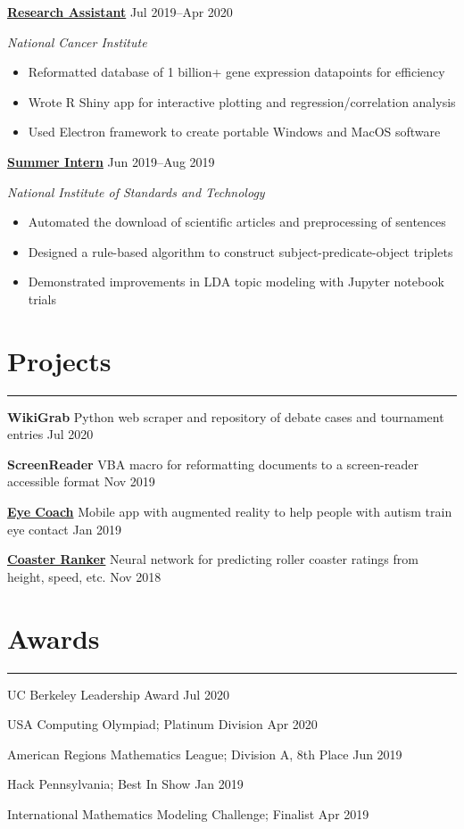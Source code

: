 \documentclass[11pt]{article}
\newcommand{\resumesection}[1]{\vspace{-0.3cm}\section*{\color{highlight}#1}\vspace{-0.3cm}\hrule\vspace{0.3cm}}
\begin{document}
\textbf{\href{https://github.com/petezh/TP-Workbench}{Research Assistant}} \hfill Jul 2019--Apr 2020 \par
\textit{National Cancer Institute}
\begin{itemize}
	\item Reformatted database of 1 billion+ gene expression datapoints for efficiency
	\item Wrote R Shiny app for interactive plotting and regression/correlation analysis
	\item Used Electron framework to create portable Windows and MacOS software
\end{itemize}\vspace{0.1cm}

\textbf{\href{https://github.com/petezh/Root-and-Rule-NLP}{Summer Intern}} \hfill Jun 2019--Aug 2019\par
\textit{National Institute of Standards and Technology}
\begin{itemize}
	\item Automated the download of scientific articles and preprocessing of sentences
	\item Designed a rule-based algorithm to construct subject-predicate-object triplets
	\item Demonstrated improvements in LDA topic modeling with Jupyter notebook trials
\end{itemize}\vspace{0.1cm}

\resumesection{Projects}

\textbf{WikiGrab} Python web scraper and repository of debate cases and tournament entries \hfill Jul 2020 \par
\vspace{0.1cm}

\textbf{ScreenReader} VBA macro for reformatting documents to a screen-reader accessible format \hfill Nov 2019 \par
\vspace{0.1cm}

\textbf{\href{https://github.com/gautomdas/eye-coach}{Eye Coach}} Mobile app with augmented reality to help people with autism train eye contact \hfill Jan 2019 \par
\vspace{0.1cm}

\textbf{\href{https://github.com/prayaggordy/HiMCM}{Coaster Ranker}} Neural network for predicting roller coaster ratings from height, speed, etc.  \hfill Nov 2018\par
\vspace{0.1cm}


\resumesection{Awards}

UC Berkeley Leadership Award \hfill Jul 2020 \par
USA Computing Olympiad; Platinum Division \hfill Apr 2020 \par
American Regions Mathematics League; Division A, 8th Place \hfill Jun 2019 \par
Hack Pennsylvania; Best In Show \hfill Jan 2019 \par
International Mathematics Modeling Challenge; Finalist \hfill Apr 2019\par
\end{document}
